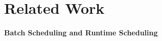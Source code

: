 \chapter{Related Work}\label{chapter:related work}
\textbf{Batch Scheduling and Runtime Scheduling}
